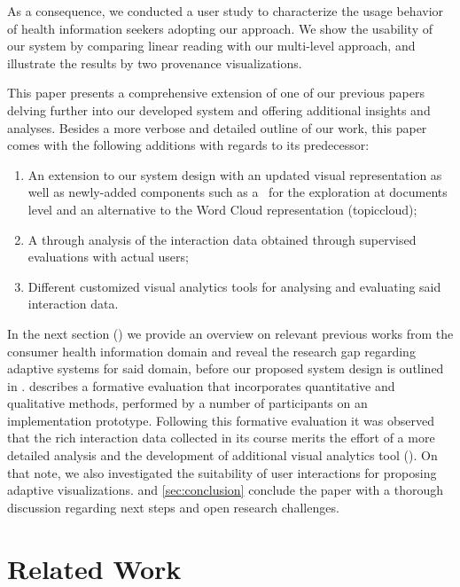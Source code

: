 As a consequence, we conducted a user study to characterize the usage behavior of health information seekers adopting our approach. 
%
We show the usability of our system by comparing linear reading with our multi-level approach, and illustrate the results by two provenance visualizations.


This paper presents a comprehensive extension of one of our previous papers \cite{lin2023ivapp} delving further into our developed system and offering additional insights and analyses. 
%
Besides a more verbose and detailed outline of our work, this paper comes with the following additions with regards to its predecessor:
\begin{enumerate}
    \item An extension to our system design with an updated visual representation as well as newly-added components such as a \DocumentLibrary\ for the exploration at documents level and an alternative to the Word Cloud representation (\acrlong{topiccloud});
    \item A through analysis of the interaction data obtained through supervised evaluations with actual users;
    \item Different customized visual analytics tools for analysing and evaluating said interaction data.
\end{enumerate}
%
In the next section () we provide an overview on relevant previous works from the consumer health information domain and reveal the research gap regarding adaptive systems for said domain, before our proposed system design is outlined in . 
%
 describes a formative evaluation that incorporates quantitative and qualitative methods, performed by a number of participants on an implementation prototype. 
%
Following this formative evaluation it was observed that the rich interaction data collected in its course merits the effort of a more detailed analysis and the development of additional visual analytics tool ().
%
On that note, we also investigated the suitability of user interactions for proposing adaptive visualizations. 
%
 and \ref{sec:conclusion} conclude the paper with a thorough discussion regarding next steps and open research challenges. 

\section{Related Work} \label{sec:related-work}

